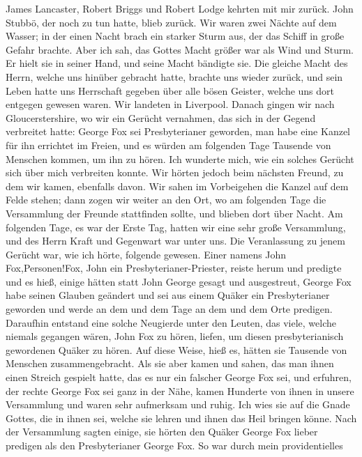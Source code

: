James Lancaster, Robert Briggs und Robert Lodge kehrten
mit mir zurück. John Stubbö, der noch zu tun hatte, blieb zurück.
Wir waren zwei Nächte auf dem Wasser; in der einen Nacht
brach ein starker Sturm aus, der das Schiff in große Gefahr
brachte. Aber ich sah, das Gottes Macht größer war als Wind
und Sturm. Er hielt sie in seiner Hand, und seine Macht bändigte
sie. Die gleiche Macht des Herrn, welche uns hinüber gebracht
hatte, brachte uns wieder zurück, und sein Leben hatte uns Herrschaft
gegeben über alle bösen Geister, welche uns dort entgegen gewesen
waren. Wir landeten in Liverpool. Danach gingen wir nach
Gloucerstershire, wo wir ein Gerücht vernahmen, das sich in der
Gegend verbreitet hatte: George Fox sei Presbyterianer geworden,
man habe eine Kanzel für ihn errichtet im Freien, und es würden
am folgenden Tage Tausende von Menschen kommen, um ihn zu
hören. Ich wunderte mich, wie ein solches Gerücht sich über
mich verbreiten konnte. Wir hörten jedoch beim nächsten
Freund, zu dem wir kamen, ebenfalls davon. Wir sahen im
Vorbeigehen die Kanzel auf dem Felde stehen; dann zogen wir
weiter an den Ort, wo am folgenden Tage die Versammlung der
Freunde stattfinden sollte, und blieben dort über Nacht. Am 
folgenden Tage, es war der Erste Tag, hatten wir eine sehr große
Versammlung, und des Herrn Kraft und Gegenwart war unter
uns. Die Veranlassung zu jenem Gerücht war, wie ich hörte,
folgende gewesen. Einer namens John Fox,\indexname{Personen!Fox, John} 
ein Presbyterianer-Priester, reiste herum und predigte und es hieß, einige hätten
statt John George gesagt und ausgestreut, George Fox habe
seinen Glauben geändert und sei aus einem Quäker ein 
Presbyterianer geworden und werde an dem und dem Tage an dem
und dem Orte predigen. Daraufhin entstand eine solche Neugierde 
unter den Leuten, das viele, welche niemals gegangen
wären, John Fox zu hören, liefen, um diesen presbyterianisch
gewordenen Quäker zu hören. Auf diese Weise, hieß es, hätten
sie Tausende von Menschen zusammengebracht. Als sie aber kamen
und sahen, das man ihnen einen Streich gespielt hatte, das es
nur ein falscher George Fox sei, 
und erfuhren, der rechte George
Fox sei ganz in der Nähe, kamen Hunderte von ihnen in unsere
Versammlung und waren sehr aufmerksam und ruhig. Ich wies
sie auf die Gnade Gottes, die in ihnen sei, welche sie lehren und
ihnen das Heil bringen könne. Nach der Versammlung sagten
einige, sie hörten den Quäker George Fox lieber predigen als den
Presbyterianer George Fox. So war durch mein providentielles
